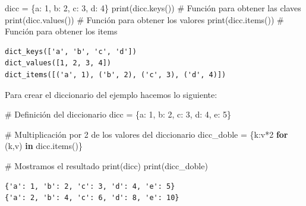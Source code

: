 \documentclass[
  spanish,
  letterpaper,
]{scrbook}
\newenvironment{Shaded}{\begin{snugshade}}{\end{snugshade}}
\newcommand{\BuiltInTok}[1]{\textcolor[rgb]{0.00,0.23,0.31}{#1}}
\newcommand{\CommentTok}[1]{\textcolor[rgb]{0.37,0.37,0.37}{#1}}
\newcommand{\ControlFlowTok}[1]{\textcolor[rgb]{0.00,0.23,0.31}{\textbf{#1}}}
\newcommand{\DecValTok}[1]{\textcolor[rgb]{0.68,0.00,0.00}{#1}}
\newcommand{\KeywordTok}[1]{\textcolor[rgb]{0.00,0.23,0.31}{\textbf{#1}}}
\newcommand{\NormalTok}[1]{\textcolor[rgb]{0.00,0.23,0.31}{#1}}
\newcommand{\OperatorTok}[1]{\textcolor[rgb]{0.37,0.37,0.37}{#1}}
\newcommand{\StringTok}[1]{\textcolor[rgb]{0.13,0.47,0.30}{#1}}
\theoremstyle{definition}
\theoremstyle{remark}
\begin{document}
\begin{Shaded}
\begin{Highlighting}[]
\NormalTok{dicc }\OperatorTok{=}\NormalTok{ \{}\StringTok{\textquotesingle{}a\textquotesingle{}}\NormalTok{: }\DecValTok{1}\NormalTok{, }\StringTok{\textquotesingle{}b\textquotesingle{}}\NormalTok{: }\DecValTok{2}\NormalTok{, }\StringTok{\textquotesingle{}c\textquotesingle{}}\NormalTok{: }\DecValTok{3}\NormalTok{, }\StringTok{\textquotesingle{}d\textquotesingle{}}\NormalTok{: }\DecValTok{4}\NormalTok{\}}
\BuiltInTok{print}\NormalTok{(dicc.keys())   }\CommentTok{\# Función para obtener las claves}
\BuiltInTok{print}\NormalTok{(dicc.values()) }\CommentTok{\# Función para obtener los valores}
\BuiltInTok{print}\NormalTok{(dicc.items())  }\CommentTok{\# Función para obtener los items}
\end{Highlighting}
\end{Shaded}

\begin{verbatim}
dict_keys(['a', 'b', 'c', 'd'])
dict_values([1, 2, 3, 4])
dict_items([('a', 1), ('b', 2), ('c', 3), ('d', 4)])
\end{verbatim}

Para crear el diccionario del ejemplo hacemos lo siguiente:

\begin{Shaded}
\begin{Highlighting}[]
\CommentTok{\# Definición del diccionario}
\NormalTok{dicc }\OperatorTok{=}\NormalTok{ \{}\StringTok{\textquotesingle{}a\textquotesingle{}}\NormalTok{: }\DecValTok{1}\NormalTok{, }\StringTok{\textquotesingle{}b\textquotesingle{}}\NormalTok{: }\DecValTok{2}\NormalTok{, }\StringTok{\textquotesingle{}c\textquotesingle{}}\NormalTok{: }\DecValTok{3}\NormalTok{, }\StringTok{\textquotesingle{}d\textquotesingle{}}\NormalTok{: }\DecValTok{4}\NormalTok{, }\StringTok{\textquotesingle{}e\textquotesingle{}}\NormalTok{: }\DecValTok{5}\NormalTok{\}}

\CommentTok{\# Multiplicación por 2 de los valores del diccionario}
\NormalTok{dicc\_doble }\OperatorTok{=}\NormalTok{ \{k:v}\OperatorTok{*}\DecValTok{2} \ControlFlowTok{for}\NormalTok{ (k,v) }\KeywordTok{in}\NormalTok{ dicc.items()\}}

\CommentTok{\# Mostramos el resultado}
\BuiltInTok{print}\NormalTok{(dicc)}
\BuiltInTok{print}\NormalTok{(dicc\_doble)}
\end{Highlighting}
\end{Shaded}

\begin{verbatim}
{'a': 1, 'b': 2, 'c': 3, 'd': 4, 'e': 5}
{'a': 2, 'b': 4, 'c': 6, 'd': 8, 'e': 10}
\end{verbatim}
\end{document}
